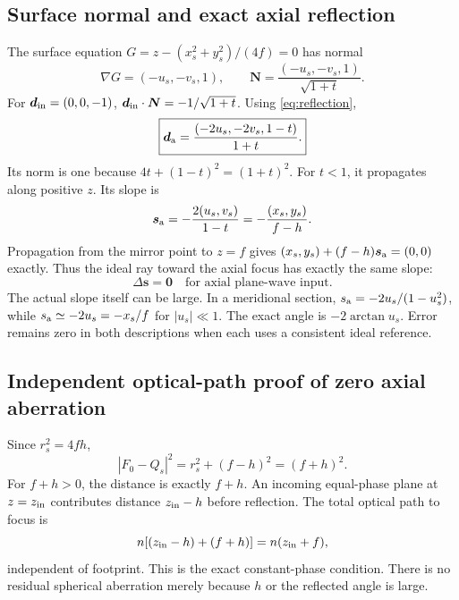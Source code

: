 \documentclass[11pt,a4paper]{article}
\numberwithin{equation}{section}
\newcommand{\vct}[1]{\bm{#1}}
\begin{document}
\subsection{Surface normal and exact axial reflection}
The surface equation $G=z-(x_s^2+y_s^2)/(4f)=0$ has normal
\[
 \nabla G=(-u_s,-v_s,1),\qquad
 \vct N=\frac{(-u_s,-v_s,1)}{\sqrt{1+t}}.
\]
For $\vct d_{\rm in}=(0,0,-1)$,
$\vct d_{\rm in}\cdot\vct N=-1/\sqrt{1+t}$.
Using \eqref{eq:reflection},
\begin{equation}
 \boxed{
 \vct d_{\rm a}
 =\frac{(-2u_s,-2v_s,1-t)}{1+t}.
 }
 \label{eq:axial-reflection}
\end{equation}
Its norm is one because
$4t+(1-t)^2=(1+t)^2$. For $t<1$, it propagates along positive $z$.
Its slope is
\begin{equation}
 \vct s_{\rm a}
 =-\frac{2(u_s,v_s)}{1-t}
 =-\frac{(x_s,y_s)}{f-h}.
 \label{eq:axial-slope}
\end{equation}
Propagation from the mirror point to $z=f$ gives
$(x_s,y_s)+(f-h)\vct s_{\rm a}=(0,0)$ exactly.
Thus the ideal ray toward the axial focus has exactly the same slope:
\begin{equation}
 \boxed{\Delta\vct s=\vct0\quad\text{for axial plane-wave input}.}
\end{equation}
The actual slope itself can be large. In a meridional section,
$s_{\rm a}=-2u_s/(1-u_s^2)$, while
$s_{\rm a}\simeq-2u_s=-x_s/f$ for $|u_s|\ll1$.
The exact angle is $-2\arctan u_s$. Error remains zero in both descriptions
when each uses a consistent ideal reference.

\subsection{Independent optical-path proof of zero axial aberration}
Since $r_s^2=4fh$,
\[
 |F_0-Q_s|^2=r_s^2+(f-h)^2=(f+h)^2.
\]
For $f+h>0$, the distance is exactly $f+h$.
An incoming equal-phase plane at $z=z_{\rm in}$ contributes distance
$z_{\rm in}-h$ before reflection. The total optical path to focus is
\[
 n[(z_{\rm in}-h)+(f+h)]=n(z_{\rm in}+f),
\]
independent of footprint. This is the exact constant-phase condition.
There is no residual spherical aberration merely because $h$ or the
reflected angle is large.
\end{document}
